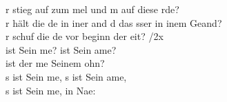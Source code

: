 
r stieg auf zum mel und m auf diese rde?\\
r hält die de in iner and d das sser in inem Geand?\\
r schuf die de vor beginn der eit?                                                       	/2x\\

 ist Sein me?  ist Sein ame?\\
 ist der me  Seinem ohn?\\

s ist Sein me, s ist Sein ame,\\
s ist Sein me, in Nae:\\

